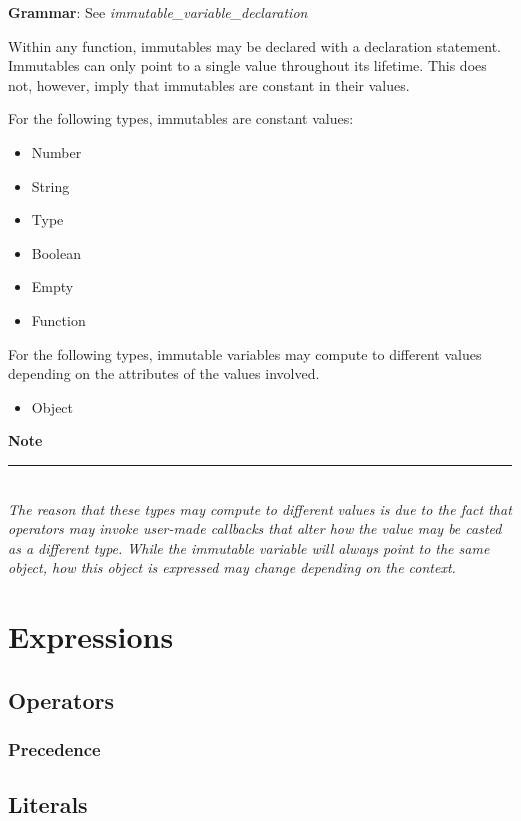 \documentclass[12pt,letterpaper]{report}
\newcommand{\noteline}{\noindent\textbf{Note}\\\noindent\rule{5cm}{0.4pt}\\}
\begin{document}
\textbf{Grammar}: See \textit{immutable\_variable\_declaration}


Within any function, immutables may be declared with a declaration statement.
Immutables can only point to a single value throughout its lifetime. This does not, however,
imply that immutables are constant in their values. 

For the following types, immutables are constant values:
\begin{itemize}
  \item Number 
  \item String 
  \item Type
  \item Boolean
  \item Empty 
  \item Function  
\end{itemize}

For the following types, immutable variables may compute to different values depending on the attributes of the values involved.
\begin{itemize}
  \item Object 
\end{itemize}





\noteline
\textit{
The reason that these types may compute to different values is due to the fact that operators may invoke user-made callbacks that 
alter how the value may be casted as a different type. While the immutable variable will always point to 
the same object, how this object is expressed may change depending on the context.
}



\chapter{Expressions}\label{Expressions}
\section{Operators}\label{Operators}
\subsection{Precedence}\label{Precedence}




\section{Literals}\label{Literals}
\end{document}
